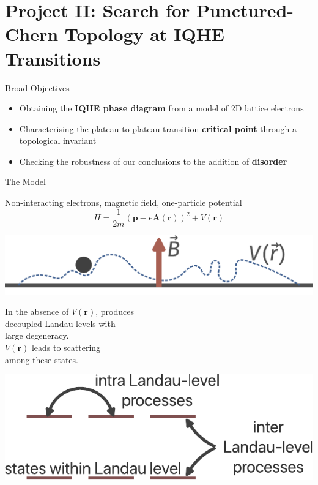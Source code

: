 \documentclass[12pt,aspectratio=169]{beamer}
\newcommand\focus[1]{%
	{\alert{\textbf{#1}}}
}
\begin{document}
\section{Project II: Search for Punctured-Chern Topology at IQHE Transitions}

\begin{frame}{Broad Objectives}

\begin{itemize}
	\item Obtaining the \focus{IQHE phase diagram} from a model of 2D lattice electrons\\[10pt]
	\item Characterising the plateau-to-plateau transition \focus{critical point} through a topological invariant\\[10pt]
	\item Checking the robustness of our conclusions to the addition of \focus{disorder}
\end{itemize}
\end{frame}

\begin{frame}{The Model}
	\begin{minipage}{0.45\textwidth}
	Non-interacting electrons, magnetic field, one-particle potential
	\[H = \frac{1}{2m}\left({\mathbf p} - e{\mathbf A({\mathbf r})}\right)^2 + V({\mathbf r})\]
	\end{minipage}
	\begin{minipage}{0.5\textwidth}
	\includegraphics[width=\textwidth]{iqheModel.pdf}
	\end{minipage}

	\vspace{\fill}
	\begin{minipage}{0.45\textwidth}
		In the absence of \(V({\mathbf r})\), produces \\
		decoupled Landau levels with\\
		large degeneracy.\\

		\(V({\mathbf r})\) leads to scattering \\
		among these states.
	\end{minipage}
	\begin{minipage}{0.5\textwidth}
	\includegraphics[width=\textwidth]{landauLevels.pdf}
	\end{minipage}
\end{frame}
\end{document}
